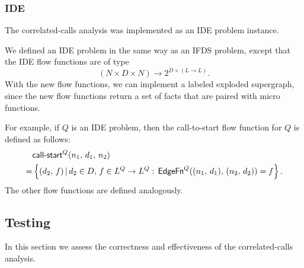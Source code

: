 \subsubsection{IDE}
The correlated-calls analysis was implemented as an IDE problem instance.

We defined an IDE problem in the same way as an IFDS problem, except that the IDE flow functions are of type
\[
  (N\times D\times N)\to2^{D\times (L\to L)}.
\]
With the new flow functions, we can implement a labeled exploded supergraph, since the new flow functions return a set of facts that are paired with micro functions.

For example, if $Q$ is an IDE problem, then the call-to-start flow function for $Q$ is defined as follows:
\begin{align*}
  &\textsf{call-start}^Q(n_1,\,d_1,\,n_2)\\
  =&\left\{(d_2,\,f)\,|\,d_2\in D,\,f\in L^Q\to L^Q:\,\textsf{EdgeFn}^Q((n_1,\,d_1),\,(n_2,\,d_2))=f\right\}.
\end{align*}
The other flow functions are defined analogously.

\subsection{Testing}
In this section we assess the correctness and effectiveness of the correlated-calls analysis.

